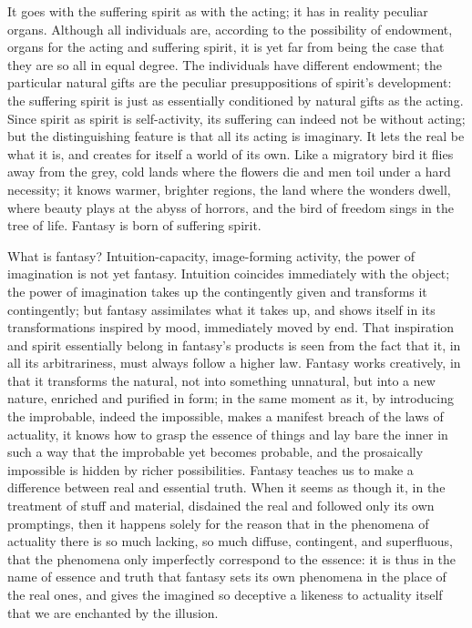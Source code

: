 \documentclass[12pt]{book}
\begin{document}
It goes with the suffering spirit as with the acting; it has in reality peculiar organs.
Although all individuals are, according to the possibility of endowment, organs for the acting
and suffering spirit, it is yet far from being the case that they are so all in equal degree.
The individuals have different endowment; the particular natural gifts are the peculiar
presuppositions of spirit's development: the suffering spirit is just as essentially
conditioned by natural gifts as the acting. Since spirit as spirit is self-activity, its
suffering can indeed not be without acting; but the distinguishing feature is that all its
acting is imaginary. It lets the real be what it is, and creates for itself a world of its own.
Like a migratory bird it flies away from the grey, cold lands where the flowers die and men
toil under a hard necessity; it knows warmer, brighter regions, the land where the wonders
dwell, where beauty plays at the abyss of horrors, and the bird of freedom sings in the tree of
life. Fantasy is born of suffering spirit.

What is fantasy? Intuition-capacity, image-forming activity, the power of imagination is not
yet fantasy. Intuition coincides immediately with the object; the power of imagination takes up
the contingently given and transforms it contingently; but fantasy assimilates what it takes
up, and shows itself in its transformations inspired by mood, immediately moved by end. That
inspiration and spirit essentially belong in fantasy's products is seen from the fact that it,
in all its arbitrariness, must always follow a higher law. Fantasy works creatively, in that it
transforms the natural, not into something unnatural, but into a new nature, enriched and
purified in form; in the same moment as it, by introducing the improbable, indeed the
impossible, makes a manifest breach of the laws of actuality, it knows how to grasp the essence
of things and lay bare the inner in such a way that the improbable yet becomes probable, and the
prosaically impossible is hidden by richer possibilities. Fantasy teaches us to make a
difference between real and essential truth. When it seems as though it, in the treatment of
stuff and material, disdained the real and followed only its own promptings, then it happens
solely for the reason that in the phenomena of actuality there is so much lacking, so much
diffuse, contingent, and superfluous, that the phenomena only imperfectly correspond to the
essence: it is thus in the name of essence and truth that fantasy sets its own phenomena in the
place of the real ones, and gives the imagined so deceptive a likeness to actuality itself that
we are enchanted by the illusion.
\end{document}
